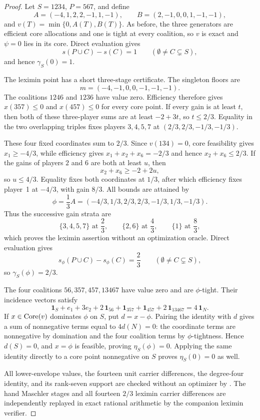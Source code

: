 \begin{proof}
Let $S=1234$, $P=567$, and define
\[
 A=(-4,1,2,2,-1,1,-1),
 \qquad
 B=(2,-1,0,0,1,-1,-1),
\]
and $v(T)=\min\{0,A(T),B(T)\}$.  As before, the three generators are
efficient core allocations and one is tight at every coalition, so $v$ is
exact and $\psi=0$ lies in its core.  Direct evaluation gives
\[
 s(P\cup C)-s(C)=1
 \qquad(\emptyset\ne C\subsetneq S),
\]
and hence $\gamma_S(0)=1$.

The leximin point has a short three-stage certificate.  The singleton floors
are
\[
 m=(-4,-1,0,0,-1,-1,-1).
\]
The coalitions $1246$ and $1236$ have value zero.  Efficiency therefore gives
$x(357)\leq0$ and $x(457)\leq0$ for every core point.  If every gain is at
least $t$, then both of these three-player sums are at least $-2+3t$, so
$t\leq2/3$.  Equality in the two overlapping triples fixes players
$3,4,5,7$ at $(2/3,2/3,-1/3,-1/3)$.

These four fixed coordinates sum to $2/3$.  Since $v(134)=0$, core
feasibility gives $x_1\geq-4/3$, while efficiency gives
$x_1+x_2+x_6=-2/3$ and hence $x_2+x_6\leq2/3$.  If the gains of players
$2$ and $6$ are both at least $u$, then
\[
 x_2+x_6\geq-2+2u,
\]
so $u\leq4/3$.  Equality fixes both coordinates at $1/3$, after which
efficiency fixes player~1 at $-4/3$, with gain $8/3$.  All bounds are attained
by
\[
 \phi=\frac13A
 =(-4/3,1/3,2/3,2/3,-1/3,1/3,-1/3).
\]
Thus the successive gain strata are
\[
 \{3,4,5,7\}\text{ at }\frac23,
 \qquad \{2,6\}\text{ at }\frac43,
 \qquad \{1\}\text{ at }\frac83,
\]
which proves the leximin assertion without an optimization oracle.  Direct
evaluation gives
\[
 s_\phi(P\cup C)-s_\phi(C)=\frac23
 \qquad(\emptyset\ne C\subsetneq S),
\]
so $\gamma_S(\phi)=2/3$.

The four coalitions $56,357,457,13467$ have value zero and are $\phi$-tight.
Their incidence vectors satisfy
\[
 \mathbf1_S+e_1+3e_2+2\,\mathbf1_{56}
 +\mathbf1_{357}+\mathbf1_{457}+2\,\mathbf1_{13467}
 =4\,\mathbf1_N.                                    \tag{OT}
 \label{eq:lx-n7-outside-triple-identity}
\]
If $x\in\operatorname{Core}(v)$ dominates $\phi$ on $S$, put $d=x-\phi$.  Pairing the
identity with $d$ gives a sum of nonnegative terms equal to $4d(N)=0$:
the coordinate terms are nonnegative by domination and the four coalition
terms by $\phi$-tightness.  Hence $d(S)=0$, and $x=\phi$ is feasible, proving
$\eta_S(\phi)=0$.  Applying the same identity directly to a core point
nonnegative on $S$ proves $\eta_S(0)=0$ as well.

All lower-envelope values, the fourteen unit carrier differences, the
degree-four identity, and its rank-seven support are checked without an
optimizer by
.
The hand Maschler stages and all fourteen $2/3$ leximin carrier differences
are independently replayed in exact rational arithmetic by the companion
leximin verifier.
\end{proof}

